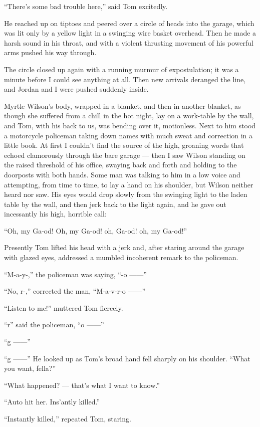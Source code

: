 \documentclass{znotebook}
\begin{document}
``There's some bad trouble here,'' said Tom excitedly.

He reached up on tiptoes and peered over a circle of heads into the garage, which was lit only by a yellow light in a swinging wire basket overhead. Then he made a harsh sound in his throat, and with a violent thrusting movement of his powerful arms pushed his way through.

The circle closed up again with a running murmur of expostulation; it was a minute before I could see anything at all. Then new arrivals deranged the line, and Jordan and I were pushed suddenly inside.

Myrtle Wilson's body, wrapped in a blanket, and then in another blanket, as though she suffered from a chill in the hot night, lay on a work-table by the wall, and Tom, with his back to us, was bending over it, motionless. Next to him stood a motorcycle policeman taking down names with much sweat and correction in a little book. At first I couldn't find the source of the high, groaning words that echoed clamorously through the bare garage — then I saw Wilson standing on the raised threshold of his office, swaying back and forth and holding to the doorposts with both hands. Some man was talking to him in a low voice and attempting, from time to time, to lay a hand on his shoulder, but Wilson neither heard nor saw. His eyes would drop slowly from the swinging light to the laden table by the wall, and then jerk back to the light again, and he gave out incessantly his high, horrible call:

``Oh, my Ga-od! Oh, my Ga-od! oh, Ga-od! oh, my Ga-od!''

Presently Tom lifted his head with a jerk and, after staring around the garage with glazed eyes, addressed a mumbled incoherent remark to the policeman.

``M-a-y-,'' the policeman was saying, ``-o ——''

``No, r-,'' corrected the man, ``M-a-v-r-o ——''

``Listen to me!'' muttered Tom fiercely.

``r'' said the policeman, ``o ——''

``g ——''

``g ——'' He looked up as Tom's broad hand fell sharply on his shoulder. ``What you want, fella?''

``What happened? — that's what I want to know.''

``Auto hit her. Ins'antly killed.''

``Instantly killed,'' repeated Tom, staring.
\end{document}
